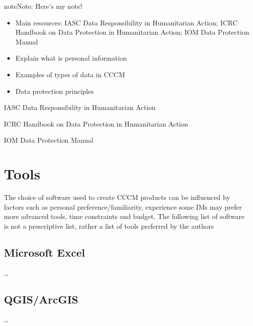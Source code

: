 \documentclass[letterpaper,10pt,english]{jupyterBook}
\begin{document}
\begin{sphinxShadowBox}
\sphinxstylesidebartitle{}

\begin{sphinxadmonition}{note}{Note:}
\sphinxAtStartPar
Here’s my note!
\end{sphinxadmonition}
\end{sphinxShadowBox}

\sphinxAtStartPar
{}
\begin{itemize}
\item {} 
\sphinxAtStartPar
Main resources: IASC Data Responsibility in Humanitarian Action; ICRC Handbook on Data Protection in Humanitarian Action; IOM Data Protection Manual

\item {} 
\sphinxAtStartPar
Explain what is personal information

\item {} 
\sphinxAtStartPar
Examples of types of data in CCCM

\item {} 
\sphinxAtStartPar
Data protection principles

\end{itemize}

\sphinxAtStartPar
IASC Data Responsibility in Humanitarian Action

\sphinxAtStartPar
ICRC Handbook on Data Protection in Humanitarian Action

\sphinxAtStartPar
IOM Data Protection Manual


\chapter{Tools}
\label{\detokenize{part1/tools:tools}}\label{\detokenize{part1/tools::doc}}
\sphinxAtStartPar
The choice of software used to create CCCM products can be influenced by factors such as personal preference/familiarity, experience \sphinxhyphen{} some IMs may prefer more advanced tools, time constraints and budget. The following list of software is not a prescriptive list, rather a list of tools preferred by the authors


\section{Microsoft Excel}
\label{\detokenize{part1/tools:microsoft-excel}}
\sphinxAtStartPar
…


\section{QGIS/ArcGIS}
\label{\detokenize{part1/tools:qgis-arcgis}}
\sphinxAtStartPar
…
\end{document}
